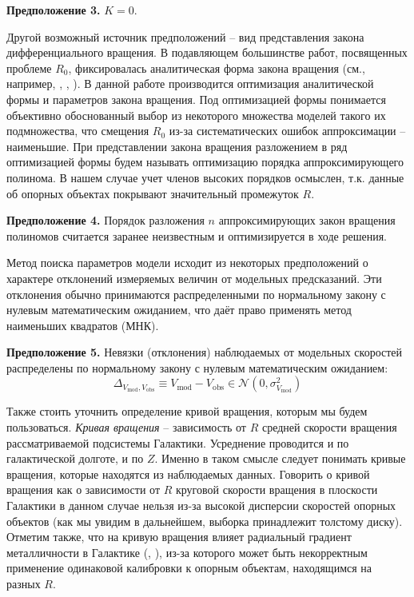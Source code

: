 \documentclass{matmex-diploma-custom}
\begin{document}
\textbf{Предположение 3.}
$K = 0$.

\par Другой возможный источник предположений -- вид представления закона дифференциального вращения. В подавляющем большинстве работ, посвященных проблеме $R_0$, фиксировалась аналитическая форма закона вращения (см., например, \cite{Loktin}, \cite{Blitz}, \cite{Gwinn}). В данной работе производится оптимизация аналитической формы и параметров закона вращения. Под оптимизацией формы понимается объективно обоснованный выбор из некоторого множества моделей такого их подмножества, что смещения $R_0$ из-за систематических ошибок аппроксимации -- наименьшие. При представлении закона вращения разложением в ряд оптимизацией формы будем называть оптимизацию порядка аппроксимирующего полинома. В нашем случае учет членов высоких порядков осмыслен, т.к. данные об опорных объектах покрывают значительный промежуток $R$.

\textbf{Предположение 4.}
Порядок разложения $n$ аппроксимирующих закон вращения полиномов считается заранее неизвестным и оптимизируется в ходе решения.

Метод поиска параметров модели исходит из некоторых предположений о характере отклонений измеряемых величин от модельных предсказаний. Эти отклонения обычно принимаются распределенными по нормальному закону с нулевым математическим ожиданием, что даёт право применять метод наименьших квадратов (МНК).

\textbf{Предположение 5.}
Невязки (отклонения) наблюдаемых от модельных скоростей распределены по нормальному закону с нулевым математическим ожиданием: 
\begin{equation}
        \Delta_{V_{\mathrm{mod}}, V_{\mathrm{obs}}} \equiv V_{\mathrm{mod}} - V_{\mathrm{obs}} \in \mathcal{N}(0, \sigma^2_{V_{\mathrm{mod}}})
\end{equation}


Также стоить уточнить определение кривой вращения, которым мы будем пользоваться. \textit{Кривая вращения} -- зависимость от $R$ средней скорости вращения рассматриваемой подсистемы Галактики. Усреднение проводится и по галактической долготе, и по $Z$. Именно в таком смысле следует понимать кривые вращения, которые находятся из наблюдаемых данных. Говорить о кривой вращения как о зависимости от $R$ круговой скорости вращения в плоскости Галактики в данном случае нельзя из-за высокой дисперсии скоростей опорных объектов (как мы увидим в дальнейшем, выборка принадлежит толстому диску). Отметим также, что на кривую вращения влияет радиальный градиент металличности в Галактике (\cite{FishB}, \cite{FishT}), из-за которого может быть некорректным применение одинаковой калибровки к опорным объектам, находящимся на разных $R$. 
\end{document}
